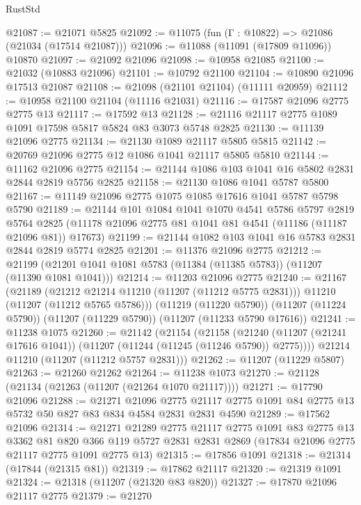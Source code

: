\begin{lexlean}{RustStd}
\begin{coremodule}
@21087 := @21071 @5825
@21092 := @11075 (fun (Γ : @10822) => @21086 (@21034 (@17514 @21087)))
@21096 := @11088 (@11091 (@17809 @11096)) @10870
@21097 := @21092 @21096
@21098 := @10958 @21085
@21100 := @21032 (@10883 @21096)
@21101 := @10792 @21100
@21104 := @10890 @21096 @17513 @21087
@21108 := @21098 (@21101 @21104) (@11111 @20959)
@21112 := @10958 @21100 @21104 (@11116 @21031)
@21116 := @17587 @21096 @2775 @2775 @13
@21117 := @17592 @13
@21128 := @21116 @21117 @2775 @1089 @1091 @17598 @5817 @5824 @83 @3073 @5748 @2825
@21130 := @11139 @21096 @2775
@21134 := @21130 @1089 @21117 @5805 @5815
@21142 := @20769 @21096 @2775 @12 @1086 @1041 @21117 @5805 @5810
@21144 := @11162 @21096 @2775
@21154 := @21144 @1086 @103 @1041 @16 @5802 @2831 @2844 @2819 @5756 @2825
@21158 := @21130 @1086 @1041 @5787 @5800
@21167 := @11149 @21096 @2775 @1075 @1085 @17616 @1041 @5787 @5798 @5790
@21189 := @21144
    @101
    @1084
    @1041
    @1070
    @4541
    @5786
    @5797
    @2819
    @5764
    @2825
    (@11178 @21096 @2775 @81 @1041 @81 @4541 (@11186 (@11187 @21096 @81)) @17673)
@21199 := @21144 @1082 @103 @1041 @16 @5783 @2831 @2844 @2819 @5774 @2825
@21201 := @11376 @21096 @2775
@21212 := @21199 (@21201 @1041 @1081 @5783 (@11384 (@11385 @5783)) (@11207 (@11390 @1081 @1041)))
@21214 := @11203 @21096 @2775
@21240 := @21167
    (@21189
      (@21212 @21214 @11210 (@11207 (@11212 @5775 @2831)))
      @11210
      (@11207 (@11212 @5765 @5786)))
    (@11219 (@11220 @5790))
    (@11207 (@11224 @5790))
    (@11207 (@11229 @5790))
    (@11207 (@11233 @5790 @17616))
@21241 := @11238 @1075
@21260 := @21142
    (@21154
      (@21158
        (@21240 (@11207 (@21241 @17616 @1041)) (@11207 (@11244 (@11245 (@11246 @5790)) @2775))))
      @21214
      @11210
      (@11207 (@11212 @5757 @2831)))
@21262 := @11207 (@11229 @5807)
@21263 := @21260 @21262
@21264 := @11238 @1073
@21270 := @21128 (@21134 (@21263 (@11207 (@21264 @1070 @21117))))
@21271 := @17790 @21096
@21288 := @21271
    @21096
    @2775
    @21117
    @2775
    @1091
    @84
    @2775
    @13
    @5732
    @50
    @827
    @83
    @834
    @4584
    @2831
    @2831
    @4590
@21289 := @17562 @21096
@21314 := @21271
    @21289
    @2775
    @21117
    @2775
    @1091
    @83
    @2775
    @13
    @3362
    @81
    @820
    @366
    @119
    @5727
    @2831
    @2831
    @2869
    (@17834 @21096 @2775 @21117 @2775 @1091 @2775 @13)
@21315 := @17856 @1091
@21318 := @21314 (@17844 (@21315 @81))
@21319 := @17862 @21117
@21320 := @21319 @1091
@21324 := @21318 (@11207 (@21320 @83 @820))
@21327 := @17870 @21096 @21117 @2775
@21379 := @21270

\end{coremodule}
\end{lexlean}
